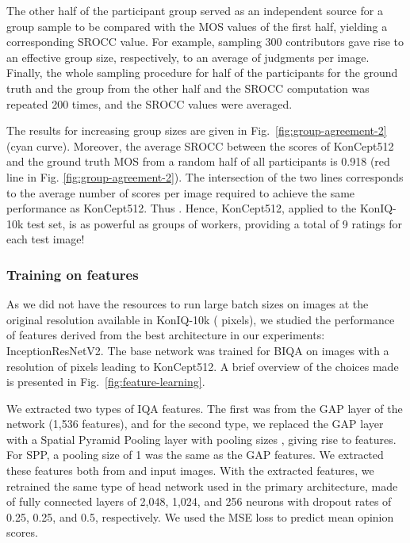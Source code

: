 \documentclass[10pt,journal,compsoc]{IEEEtran}
\begin{document}
The other half of the participant group served as an independent source for a group sample to be compared with the MOS values of the first half, yielding a corresponding SROCC value. For example, sampling 300 contributors gave rise to an effective group size,  respectively, to an average of  judgments per image. Finally, the whole sampling procedure for half of the participants for the ground truth and the group from the other half and the SROCC computation was repeated 200 times, and the SROCC values were averaged.

The results for increasing group sizes are given in Fig.\ \ref{fig:group-agreement-2} (cyan curve). Moreover, the average SROCC between the scores of KonCept512 and the ground truth MOS from a random half of all participants is 0.918  (red line in Fig. \ref{fig:group-agreement-2}). The intersection of the two lines corresponds to the average number of scores per image required to achieve the same performance as KonCept512. Thus . Hence, KonCept512, applied to the KonIQ-10k test set, is as powerful as groups of  workers, providing a total of 9 ratings for each test image!


\subsubsection{Training on features}

As we did not have the resources to run large batch sizes on images at the original resolution available in KonIQ-10k ( pixels), we studied the performance of features derived from the best architecture in our experiments: InceptionResNetV2. The base network was trained for BIQA on images with a resolution of  pixels leading to KonCept512. A brief overview of the choices made is presented in Fig.~\ref{fig:feature-learning}.

We extracted two types of IQA features. The first was from the GAP layer of the network (1,536 features), and for the second type, we replaced the GAP layer with a Spatial Pyramid Pooling layer with pooling sizes , giving rise to  features. For SPP, a pooling size of 1 was the same as the GAP features. We extracted these features both from  and  input images. With the extracted features, we retrained the same type of head network used in the primary architecture, made of fully connected layers of 2,048, 1,024, and 256 neurons with dropout rates of 0.25, 0.25, and 0.5, respectively. We used the MSE loss to predict mean opinion scores.
\end{document}
